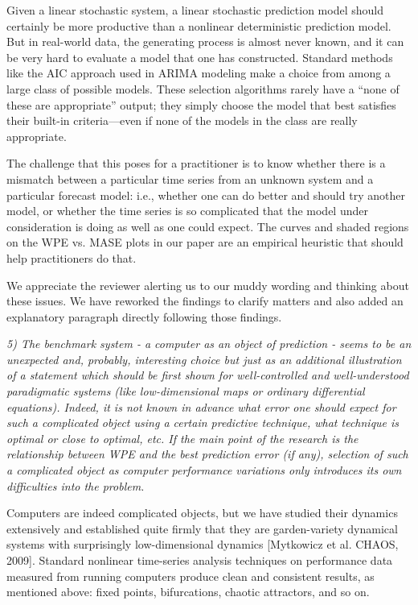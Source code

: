 \documentclass[12pt]{article}
\begin{document}
Given a linear stochastic system, a linear stochastic prediction model
should certainly be more productive than a nonlinear deterministic
prediction model.  But in real-world data, the generating process is
almost never known, and it can be very hard to evaluate a model that
one has constructed.  Standard methods like the AIC approach used in
ARIMA modeling make a choice from among a large class of possible
models.  These selection algorithms rarely have a ``none of these are
appropriate'' output; they simply choose the model that best satisfies
their built-in criteria---even if none of the models in the class are
really appropriate.

The challenge that this poses for a practitioner is to know whether
there is a mismatch between a particular time series from an unknown
system and a particular forecast model: i.e., whether one can do
better and should try another model, or whether the time series is so
complicated that the model under consideration is doing as well as one
could expect.  The curves and shaded regions on the WPE vs. MASE plots
in our paper are an empirical heuristic that should help practitioners
do that.

We appreciate the reviewer alerting us to our muddy wording and
thinking about these issues.  We have reworked the findings to clarify
matters and also added an explanatory paragraph directly following
those findings.  

\smallskip

\emph{5) The benchmark system - a computer as an object of prediction
  - seems to be an unexpected and, probably, interesting choice but
  just as an additional illustration of a statement which should be
  first shown for well-controlled and well-understood paradigmatic
  systems (like low-dimensional maps or ordinary differential
  equations). Indeed, it is not known in advance what error one should
  expect for such a complicated object using a certain predictive
  technique, what technique is optimal or close to optimal, etc. If
  the main point of the research is the relationship between WPE and
  the best prediction error (if any), selection of such a complicated
  object as computer performance variations only introduces its own
  difficulties into the problem.}

Computers are indeed complicated objects, but we have studied their
dynamics extensively and established quite firmly that they are
garden-variety dynamical systems with surprisingly low-dimensional
dynamics [Mytkowicz et al. CHAOS, 2009].  Standard nonlinear
time-series analysis techniques on performance data measured from
running computers produce clean and consistent results, as mentioned
above: fixed points, bifurcations, chaotic attractors, and so on.
\end{document}
